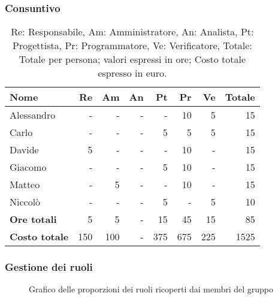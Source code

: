 \subsubsection{Consuntivo}
\begin{table}[H]
	\centering
	\begin{tabular}{l|r|r|r|r|r|r|r}
		\textbf{Nome}         & \textbf{Re} & \textbf{Am} & \textbf{An} & \textbf{Pt} & \textbf{Pr} & \textbf{Ve} & \textbf{Totale} \\
		\hline
		Alessandro            & -           & -           & -           & -           & 10           & 5           & 15              \\
		Carlo                 & -           & -           & -           & 5           & 5           & 5           & 15              \\
		Davide                & 5           & -           & -           & -           & 10           & -           & 15              \\
		Giacomo               & -           & -           & -           & 5           & 10           & -           & 15              \\
		Matteo                & -           & 5           & -           & -           & 10           & -           & 15              \\
		Niccolò               & -           & -           & -           & 5           & -           & 5           & 10              \\
		\hline
		\textbf{Ore totali}   & 5           & 5           & -           & 15          & 45          & 15          & 85              \\
		\textbf{Costo totale} & 150         & 100         & -           & 375         & 675         & 225         & 1525
	\end{tabular}
	\caption{Re: Responsabile, Am: Amministratore, An: Analista, Pt: Progettista,
		Pr: Programmatore, Ve: Verificatore, Totale: Totale per persona; valori espressi in ore; Costo totale espresso in euro.}
\end{table}

\subsubsection{Gestione dei ruoli}
\begin{figure}[h]
	\centering
	\caption{Grafico delle proporzioni dei ruoli ricoperti dai membri del gruppo}
\end{figure}


